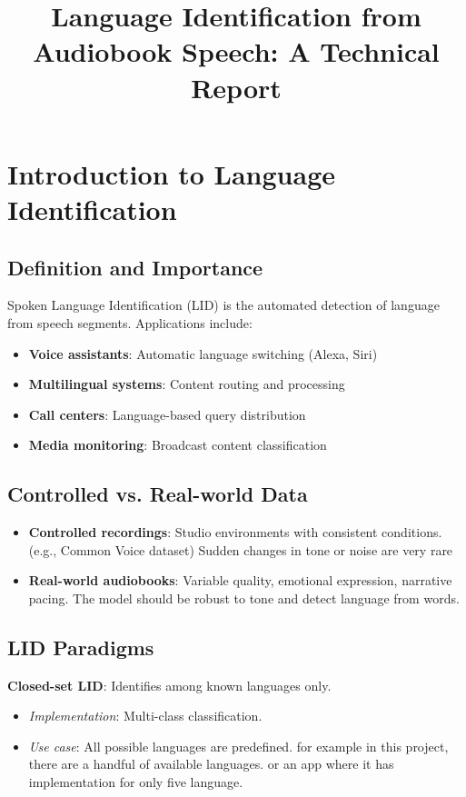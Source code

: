 \documentclass[12pt,a4paper]{article}
\title{Language Identification from Audiobook Speech: A Technical Report}
\author{}
\date{}
\begin{document}
	
	\maketitle
	
	
	\section{Introduction to Language Identification}
	
	\subsection{Definition and Importance}
	Spoken Language Identification (LID) is the automated detection of language from speech segments. Applications include:
	\begin{itemize}
		\item \textbf{Voice assistants}: Automatic language switching (Alexa, Siri)
		\item \textbf{Multilingual systems}: Content routing and processing
		\item \textbf{Call centers}: Language-based query distribution
		\item \textbf{Media monitoring}: Broadcast content classification
	\end{itemize}
	
	\subsection{Controlled vs. Real-world Data}
	\begin{itemize}
		\item \textbf{Controlled recordings}: Studio environments with consistent conditions. (e.g., Common Voice dataset) Sudden changes in tone or noise are very rare 
		\item \textbf{Real-world audiobooks}: Variable quality, emotional expression, narrative pacing. The model should be robust to tone and detect language from words.
	\end{itemize}
	
	\subsection{LID Paradigms}
	\textbf{Closed-set LID}: Identifies among known languages only.
	\begin{itemize}
		\item \textit{Implementation}: Multi-class classification.
		\item \textit{Use case}: All possible languages are predefined. for example in this project, there are a handful of available languages. or an app where it has implementation for only five language.
	\end{itemize}
	
\end{document}
